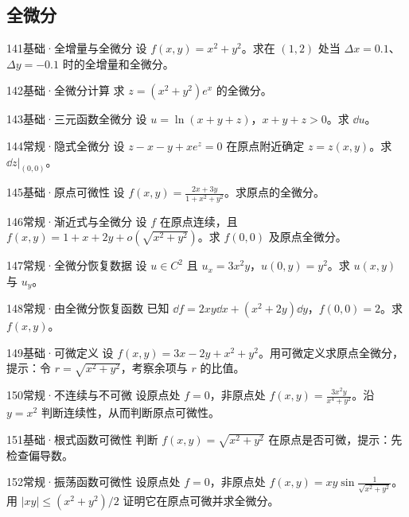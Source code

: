\subsection{全微分}
\begin{exercise}{141}{基础·全增量与全微分}
设 $f(x,y)=x^2+y^2$。求在 $(1,2)$ 处当 $\Delta x=0.1$、$\Delta y=-0.1$ 时的全增量和全微分。
\end{exercise}
\begin{exercise}{142}{基础·全微分计算}
求 $z=(x^2+y^2)e^x$ 的全微分。
\end{exercise}
\begin{exercise}{143}{基础·三元函数全微分}
设 $u=\ln(x+y+z)$，$x+y+z>0$。求 $\dd u$。
\end{exercise}
\begin{exercise}{144}{常规·隐式全微分}
设 $z-x-y+xe^z=0$ 在原点附近确定 $z=z(x,y)$。求 $\dd z|_{(0,0)}$。
\end{exercise}
\begin{exercise}{145}{基础·原点可微性}
设 $f(x,y)=\frac{2x+3y}{1+x^2+y^2}$。求原点的全微分。
\end{exercise}
\begin{exercise}{146}{常规·渐近式与全微分}
设 $f$ 在原点连续，且 $f(x,y)=1+x+2y+o(\sqrt{x^2+y^2})$。求 $f(0,0)$ 及原点全微分。
\end{exercise}
\begin{exercise}{147}{常规·全微分恢复数据}
设 $u\in C^2$ 且 $u_x=3x^2y$，$u(0,y)=y^2$。求 $u(x,y)$ 与 $u_y$。
\end{exercise}
\begin{exercise}{148}{常规·由全微分恢复函数}
已知 $\dd f=2xy\dd x+(x^2+2y)\dd y$，$f(0,0)=2$。求 $f(x,y)$。
\end{exercise}
\begin{exercise}{149}{基础·可微定义}
设 $f(x,y)=3x-2y+x^2+y^2$。用可微定义求原点全微分，提示：令 $r=\sqrt{x^2+y^2}$，考察余项与 $r$ 的比值。
\end{exercise}
\begin{exercise}{150}{常规·不连续与不可微}
设原点处 $f=0$，非原点处 $f(x,y)=\frac{3x^2y}{x^4+y^2}$。沿 $y=x^2$ 判断连续性，从而判断原点可微性。
\end{exercise}
\begin{exercise}{151}{基础·根式函数可微性}
判断 $f(x,y)=\sqrt{x^2+y^2}$ 在原点是否可微，提示：先检查偏导数。
\end{exercise}
\begin{exercise}{152}{常规·振荡函数可微性}
设原点处 $f=0$，非原点处 $f(x,y)=xy\sin\frac1{\sqrt{x^2+y^2}}$。用 $|xy|\le(x^2+y^2)/2$ 证明它在原点可微并求全微分。
\end{exercise}
